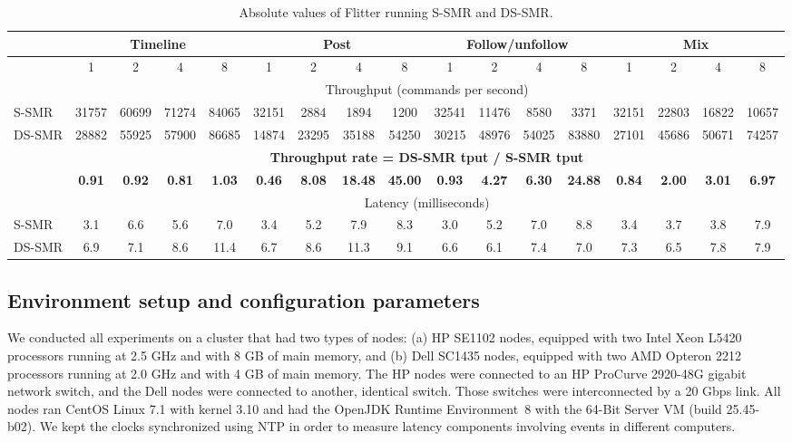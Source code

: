 \begin{table}[htdp]
\vspace{10mm}
\caption{Absolute values of Flitter running S-SMR and DS-SMR.}
\centering
\begin{tabular}{|l|c|c|c|c|c|c|c|c|c|c|c|c|c|c|c|c|} \hline
& \multicolumn{4}{|c|}{Timeline}	 &  \multicolumn{4}{|c|}{Post} &  \multicolumn{4}{|c|}{Follow/unfollow} &  \multicolumn{4}{|c|}{Mix} \\ \hline
		& 1	      & 2	   & 4		 & 8	       & 1	     & 2	 & 4		 & 8	     & 1	  & 2		 & 4	        & 8	     & 1	   & 2		& 4	       & 8	 \\ \hline\hline
		& \multicolumn{16}{|c|}{Throughput (commands per second)} \\ \hline
S-SMR  	& 31757 & 60699 & 71274 & 84065 & 32151 & 2884  & 1894	 & 1200   & 32541 & 11476 & 8580    & 3371   & 32151 & 22803 & 16822 & 10657 \\ \hline
DS-SMR	& 28882 & 55925 & 57900 & 86685 & 14874 & 23295 & 35188	 & 54250 & 30215 & 48976 & 54025	& 83880 & 27101 & 45686 & 50671 & 74257 \\ \hline\hline
		& \multicolumn{16}{|c|}{\textbf{Throughput rate = DS-SMR tput / S-SMR tput}} \\ \hline
		& \textbf{0.91} & \textbf{0.92}	& \textbf{0.81} & \textbf{1.03}  		& \textbf{0.46}  & \textbf{8.08}	  & \textbf{18.48}	 & \textbf{45.00}  & \textbf{0.93}    & \textbf{4.27}	  & \textbf{6.30}	& \textbf{24.88}  & \textbf{0.84}	    & \textbf{2.00}	& \textbf{3.01}	& \textbf{6.97}	 \\ \hline\hline
		& \multicolumn{16}{|c|}{Latency (milliseconds)} \\ \hline
S-SMR	& 3.1 & 6.6 & 5.6 & 7.0  & 3.4	& 5.2		& 7.9		& 8.3		& 3.0		& 5.2		& 7.0		& 8.8		& 3.4		& 3.7		& 3.8		& 7.9	 \\ \hline
DS-SMR	& 6.9 & 7.1 & 8.6 & 11.4 & 6.7	& 8.6		& 11.3	& 9.1		& 6.6		& 6.1		& 7.4		& 7.0		& 7.3		& 6.5		& 7.8		& 7.9	 \\ \hline
\end{tabular}
\label{tbl:results}
\vspace{10mm}
\end{table}%

\subsection{Environment setup and configuration parameters}
\label{sec:evaluation:setup}

We conducted all experiments on a cluster that had two types of nodes: (a) HP SE1102 nodes, equipped with two Intel Xeon L5420 processors running at 2.5 GHz and with 8 GB of main memory, and (b) Dell SC1435 nodes, equipped with two AMD Opteron 2212 processors running at 2.0 GHz and with 4 GB of main memory. The HP nodes were connected to an HP ProCurve 2920-48G gigabit network switch, and the Dell nodes were connected to another, identical switch. Those switches were interconnected by a 20 Gbps link.
All nodes ran CentOS Linux 7.1 with kernel 3.10 and had the OpenJDK Runtime Environment~8 with the \mbox{64-Bit} Server VM (build 25.45-b02).
We kept the clocks synchronized using NTP in order to measure latency components involving events in different computers.

